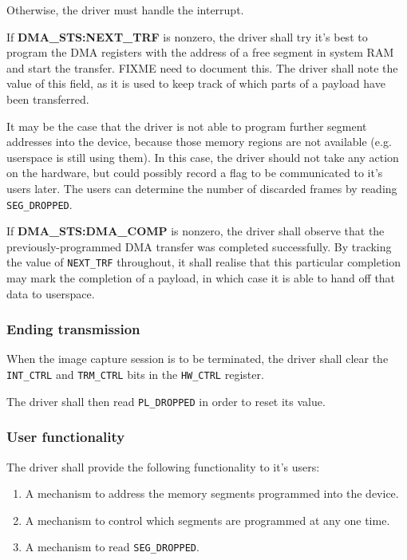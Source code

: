 \documentclass[12pt]{article}
\begin{document}
Otherwise, the driver must handle the interrupt.

If \textbf{DMA\_STS:NEXT\_TRF} is nonzero, the driver shall try it's best to program the DMA registers with the address of a free segment in system RAM and start the transfer. FIXME need to document this. The driver shall note the value of this field, as it is used to keep track of which parts of a payload have been transferred.

It may be the case that the driver is not able to program further segment addresses into the device, because those memory regions are not available (e.g. userspace is still using them). In this case, the driver should not take any action on the hardware, but could possibly record a flag to be communicated to it's users later. The users can determine the number of discarded frames by reading \texttt{SEG\_DROPPED}.

If \textbf{DMA\_STS:DMA\_COMP} is nonzero, the driver shall observe that the previously-programmed DMA transfer was completed successfully. By tracking the value of \texttt{NEXT\_TRF} throughout, it shall realise that this particular completion may mark the completion of a payload, in which case it is able to hand off that data to userspace.

\subsubsection{Ending transmission}

When the image capture session is to be terminated, the driver shall clear the \texttt{INT\_CTRL} and \texttt{TRM\_CTRL} bits in the \texttt{HW\_CTRL} register.

The driver shall then read \texttt{PL\_DROPPED} in order to reset its value.

\subsubsection{User functionality}

The driver shall provide the following functionality to it's users:

\begin{enumerate}
\item A mechanism to address the memory segments programmed into the device.
\item A mechanism to control which segments are programmed at any one time.
\item A mechanism to read \texttt{SEG\_DROPPED}.
\end{enumerate}
\end{document}
